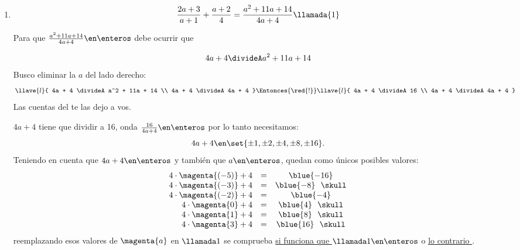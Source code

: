 \begin{enumerate}[label=\enumeracion*)]
  \item
        $$
          \frac{2a + 3}{a+1} + \frac{a+2}{4} = \frac{a^2 + 11a + 14}{4a+4} \llamada{1}
        $$

        Para que $\frac{a^2 + 11a + 14}{4a+4} \en \enteros$ debe ocurrir que

        $$
          4a + 4 \divideA a^2 + 11a + 14
        $$
        Busco eliminar la $a$ del lado derecho:
        $$
          \llave{l}{
            4a + 4 \divideA a^2 + 11a + 14 \\
            4a + 4 \divideA 4a + 4
          }
          \Entonces{\red{!}}
          \llave{l}{
            4a + 4 \divideA 16 \\
            4a + 4 \divideA 4a + 4
          }
        $$
        Las cuentas del \red{!} te las dejo a vos.

        $4a+4$ tiene que dividir a 16, onda $\frac{16}{4a + 4} \en \enteros$ por lo tanto necesitamos:
        $$
          4a + 4 \en \set{\pm1,\pm2,\pm4,\pm8,\pm16}.
        $$
        Teniendo en cuenta que $4a + 4 \en \enteros$ y también que $a \en \enteros$, quedan como únicos posibles valores:
        $$
          \begin{array}{rcc}
            4 \cdot \magenta{(-5)} + 4 & = & \blue{-16}           \\
            4 \cdot \magenta{(-3)} + 4 & = & \blue{-8}  ~~ \skull \\
            4 \cdot \magenta{(-2)} + 4 & = & \blue{-4}            \\
            4 \cdot \magenta{0} + 4    & = & \blue{4}   ~~ \skull \\
            4 \cdot \magenta{1} + 4    & = & \blue{8}   ~~ \skull \\
            4 \cdot \magenta{3} + 4    & = & \blue{16} ~~ \skull
          \end{array}
        $$
        reemplazando esos valores de $\magenta{a}$ en $\llamada1$
        se comprueba \ul{si funciona que $\llamada1 \en \enteros$} o \ul{lo contrario \skull}.
\end{enumerate}

\begin{aportes}[4]
  \item {}
  \item {}
  \item {}
  \item {}
\end{aportes}
